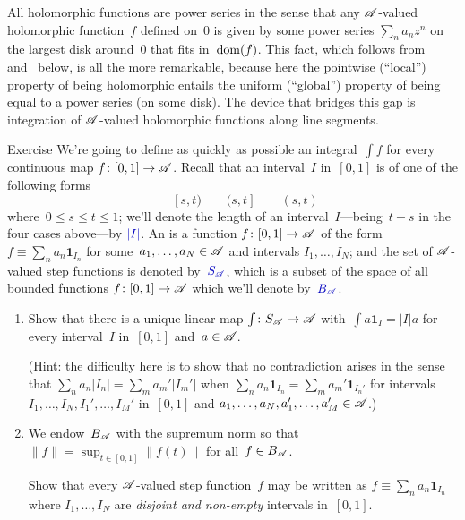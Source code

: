 \documentclass[a]{subfiles}
\begin{document}
\begin{parsec}%
\begin{point}%
All holomorphic functions
are power series
in the sense
that any $\mathscr{A}$-valued holomorphic
function~$f$ defined on~$0$
is given by some power series $\sum_n a_n z^n$
on the largest disk around~$0$
that fits in~$\operatorname{dom}(f)$.
This fact,
which follows from~
and~ below,
is all the more remarkable,
because here the pointwise (``local'') property
of being holomorphic
entails
the uniform (``global'') property
of being equal to a power
series (on some disk).
The device
that bridges
this
gap
is integration of $\mathscr{A}$-valued
holomorphic functions along
line segments.
\end{point}
\begin{point}{Exercise}%
We're going to define as quickly as possible
an integral~$\int f $
for every continuous map $f\colon [0,1]\to\mathscr{A}$.
Recall that an interval~$I$
in~$[0,1]$
is of one of the following forms
\begin{equation*}
	[s,t]\qquad[s,t)\qquad(s,t]\qquad(s,t)
\end{equation*}
where~$0\leq s\leq t\leq 1$;
we'll denote the length of an interval~$I$---being~$t-s$ 
in the four cases above---by $\Define{\left|I\right|}$.
An 
is a function $f\colon [0,1]\to\mathscr{A}$
of the form
$f\equiv \sum_n a_n \mathbf{1}_{I_n}$
for some~$a_1,\dotsc,a_N\in\mathscr{A}$
and intervals $I_1,\dotsc,I_N$;
and the set of $\mathscr{A}$-valued step functions
is denoted by~$\Define{S_\scrA}$,
which is a subset
of the space of all bounded functions
$f\colon [0,1]\to\mathscr{A}$
which we'll denote by~$\Define{B_\scrA}$.
\begin{enumerate}
\item
Show that there is a unique
linear map $\int\colon S_{\mathscr{A}}\to \mathscr{A}$
with~$\int a \mathbf{1}_{I}=\left| I \right|a$
for every interval~$I$ in~$[0,1]$
and~$a\in\mathscr{A}$.

(Hint:  the difficulty
here is to show that no contradiction
arises in the sense that 
$\sum_n a_n\left|I_n\right| = \sum_m a_m' \left|I_m'\right|$
when 
$\sum_n a_n \mathbf{1}_{I_n}=\sum_m a_m' \mathbf{1}_{I_n'}$
for intervals $I_1,\dotsc,I_N,I_1',\dotsc,I_M'$ in~$[0,1]$
and $a_1,\dotsc,a_N,a_1',\dotsc,a_M'\in\mathscr{A}$.)

\item
We endow~$B_{\mathscr{A}}$
with the supremum norm
so that $\|f\|=\sup_{t\in[0,1]} \|f(t)\|$
for all~$f\in B_{\mathscr{A}}$.

Show that every $\mathscr{A}$-valued step function~$f$
may be written as
$f\equiv \sum_n a_n \mathbf{1}_{I_n}$
where $I_1,\dotsc,I_N$
are \emph{disjoint and non-empty}
intervals in~$[0,1]$.


\end{enumerate}
\end{point}
\end{parsec}
\end{document}
